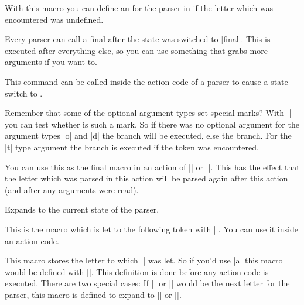 \begin{command}{\pgfparserdefunknown{}}
  With this macro you can define an  for the 
  parser in  if the letter which was encountered was undefined.
\end{command}

\begin{command}{\pgfparserdeffinal{}}
  Every parser can call a final  after the state was switched to
  |final|. This  is executed after everything else, so you can use
  something that grabs more arguments if you want to.
\end{command}

\begin{command}{\pgfparserswitch{}}
  This command can be called inside the action code of a parser to cause a
  state switch to .
\end{command}

\begin{command}{\pgfparserifmark{}}
  Remember that some of the optional argument types set special marks? With
  |\pgfparserifmark| you can test whether  is such a mark. So if
  there was no optional argument for the argument types |o| and |d| the
   branch will be executed, else the  branch. For the |t|
  type argument the  branch is executed if the token was encountered.
\end{command}

\begin{command}{\pgfparserreinsert}
  You can use this as the final macro in an action of |\pgfparserdef| or
  |\pgfparserdefunknown|. This has the effect that the letter which was parsed
  in this action will be parsed again after this action (and after any arguments
  were read).
\end{command}

\begin{command}{\pgfparserstate}
  Expands to the current state of the parser.
\end{command}

\begin{command}{\pgfparsertoken}
  This is the macro which is let to the following token with |\futurelet|. You
  can use it inside an action code.
\end{command}

\begin{command}{\pgfparserletter}
  This macro stores the letter to which |\pgfparsertoken| was let. So if
  you'd use |a| this macro would be defined with
  |\def\pgfparserletter{a}|. This definition is done before any action code is
  executed. There are two special cases: If |{| or |}| would be the next letter
  for the parser, this macro is defined to expand to |\bgroup| or |\egroup|.
\end{command}

